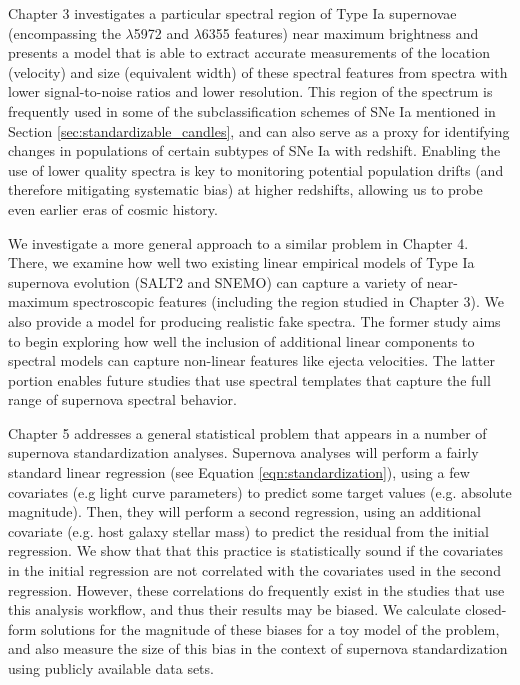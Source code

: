 Chapter 3 investigates a particular spectral region of Type Ia supernovae (encompassing the  $\lambda$5972 and  $\lambda$6355 features) near maximum brightness and presents a model that is able to extract accurate measurements of the location (velocity) and size (equivalent width) of these spectral features from spectra with lower signal-to-noise ratios and lower resolution. This region of the spectrum is frequently used in some of the subclassification schemes of SNe Ia mentioned in Section \ref{sec:standardizable_candles}, and can also serve as a proxy for identifying changes in populations of certain subtypes of SNe Ia with redshift. Enabling the use of lower quality spectra is key to monitoring potential population drifts (and therefore mitigating systematic bias) at higher redshifts, allowing us to probe even earlier eras of cosmic history.

We investigate a more general approach to a similar problem in Chapter 4. There, we examine how well two existing linear empirical models of Type Ia supernova evolution (SALT2 and SNEMO) can capture a variety of near-maximum spectroscopic features (including the region studied in Chapter 3). We also provide a model for producing realistic fake spectra. The former study aims to begin exploring how well the inclusion of additional linear components to spectral models can capture non-linear features like ejecta velocities. The latter portion enables future studies that use spectral templates that capture the full range of supernova spectral behavior.

Chapter 5 addresses a general statistical problem that appears in a number of supernova standardization analyses. Supernova analyses will perform a fairly standard linear regression (see Equation \ref{eqn:standardization}), using a few covariates (e.g light curve parameters) to predict some target values (e.g. absolute magnitude). Then, they will perform a second regression, using an additional covariate (e.g. host galaxy stellar mass) to predict the residual from the initial regression. We show that that this practice is statistically sound if the covariates in the initial regression are not correlated with the covariates used in the second regression. However, these correlations do frequently exist in the studies that use this analysis workflow, and thus their results may be biased. We calculate closed-form solutions for the magnitude of these biases for a toy model of the problem, and also measure the size of this bias in the context of supernova standardization using publicly available data sets.

